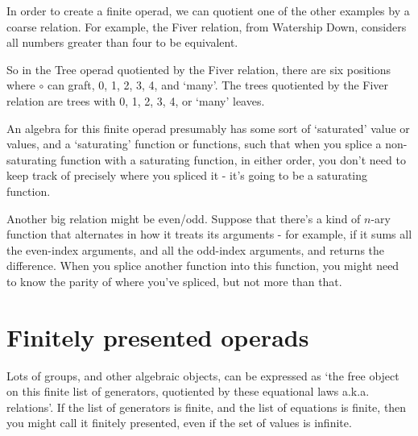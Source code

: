 \documentclass[11pt,noamsfonts]{amsart}
\begin{document}
In order to create a finite operad, we can quotient one of the other examples
by a coarse relation. For example, the Fiver relation, from Watership Down, considers all numbers greater than four to be equivalent. 

So in the Tree operad quotiented by the Fiver relation, there are six positions where \(\circ\) can graft, 0, 1, 2, 3, 4, and `many'. The trees quotiented by the Fiver relation are trees with 0, 1, 2, 3, 4, or `many' leaves. 

An algebra for this finite operad presumably has some sort of `saturated' value or values, and a `saturating' function or functions, such that when you splice a non-saturating function with a saturating function, in either order, you don't need to keep track of precisely where you spliced it - it's going to be a saturating function. 

Another big relation might be even/odd. Suppose that there's a kind of \(n\)-ary function that alternates in how it treats its arguments - for example, if it sums all the even-index arguments, and all the odd-index arguments, and returns the difference. When you splice another function into this function, you might need to know the parity of where you've spliced, but not more than that.

\section{Finitely presented operads}

Lots of groups, and other algebraic objects, can be expressed as `the free object on this finite list of generators, quotiented by these equational laws a.k.a. relations'. If the list of generators is finite, and the list of equations is finite, then you might call it finitely presented, even if the set of values is infinite.
\end{document}
